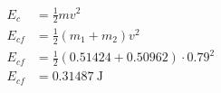 \documentclass{standalone}
\begin{document}
    \(\begin{aligned}
        E_c &= \frac{1}{2}mv^2\\
        E_{cf} &= \frac{1}{2}(m_1 + m_2) v^2\\
        E_{cf} &= \frac{1}{2} (0.51424 + 0.50962) \cdot 0.79^2\\
        E_{cf} &= \SI{0.31487}{\joule}
    \end{aligned}\)
\end{document}
